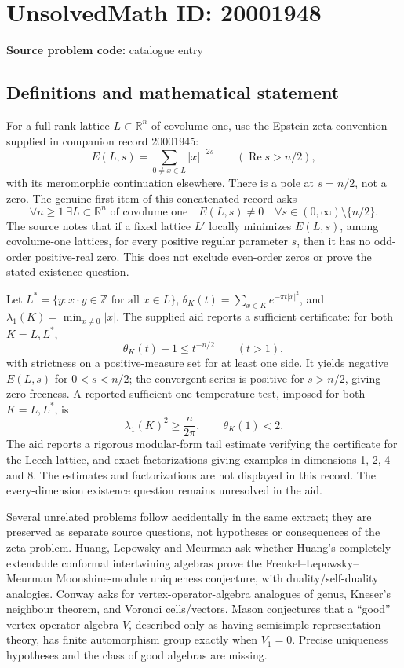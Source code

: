 \documentclass[11pt]{article}
\newcommand{\Z}{\mathbb{Z}}
\newcommand{\R}{\mathbb{R}}
\begin{document}
\section*{UnsolvedMath ID: 20001948}
\textbf{Source problem code:} catalogue entry
\subsection{Definitions and mathematical statement}
For a full-rank lattice \(L\subset\R^n\) of covolume one, use the Epstein-zeta convention supplied in companion record 20001945:
\[
E(L,s)=\sum_{0\ne x\in L}|x|^{-2s}\qquad(\operatorname{Re}s>n/2),
\]
with its meromorphic continuation elsewhere. There is a pole at \(s=n/2\), not a zero. The genuine first item of this concatenated record asks
\[
\forall n\geq1\ \exists L\subset\R^n\text{ of covolume one}\quad
E(L,s)\ne0\quad\forall s\in(0,\infty)\setminus\{n/2\}.
\]
The source notes that if a fixed lattice \(L'\) locally minimizes \(E(L,s)\), among covolume-one lattices, for every positive regular parameter \(s\), then it has no odd-order positive-real zero. This does not exclude even-order zeros or prove the stated existence question.

Let \(L^*=\{y:x\cdot y\in\Z\text{ for all }x\in L\}\), \(\theta_K(t)=\sum_{x\in K}e^{-\pi t|x|^2}\), and \(\lambda_1(K)=\min_{x\ne0}|x|\). The supplied aid reports a sufficient certificate: for both \(K=L,L^*\),
\[
\theta_K(t)-1\leq t^{-n/2}\qquad(t>1),
\]
with strictness on a positive-measure set for at least one side. It yields negative \(E(L,s)\) for \(0<s<n/2\); the convergent series is positive for \(s>n/2\), giving zero-freeness. A reported sufficient one-temperature test, imposed for both \(K=L,L^*\), is
\[
\lambda_1(K)^2\geq\frac n{2\pi},\qquad\theta_K(1)<2.
\]
The aid reports a rigorous modular-form tail estimate verifying the certificate for the Leech lattice, and exact factorizations giving examples in dimensions 1, 2, 4 and 8. The estimates and factorizations are not displayed in this record. The every-dimension existence question remains unresolved in the aid.

Several unrelated problems follow accidentally in the same extract; they are preserved as separate source questions, not hypotheses or consequences of the zeta problem. Huang, Lepowsky and Meurman ask whether Huang's completely-extendable conformal intertwining algebras prove the Frenkel--Lepowsky--Meurman Moonshine-module uniqueness conjecture, with duality/self-duality analogies. Conway asks for vertex-operator-algebra analogues of genus, Kneser's neighbour theorem, and Voronoi cells/vectors. Mason conjectures that a ``good'' vertex operator algebra \(V\), described only as having semisimple representation theory, has finite automorphism group exactly when \(V_1=0\). Precise uniqueness hypotheses and the class of good algebras are missing.
\end{document}
